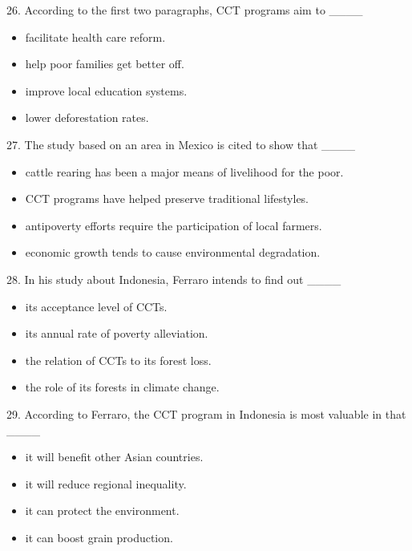 \documentclass[UTF8,11pt]{ctexart}
\begin{document}
26. According to the first two paragraphs, CCT programs aim to \_\_\_\_


\begin{itemize}[leftmargin=2em,itemsep=.2em,topsep=.4em]\item[A.] facilitate health care reform.
\item[B.] help poor families get better off.
\item[C.] improve local education systems.
\item[D.] lower deforestation rates.
\end{itemize}

27. The study based on an area in Mexico is cited to show that \_\_\_\_


\begin{itemize}[leftmargin=2em,itemsep=.2em,topsep=.4em]\item[A.] cattle rearing has been a major means of livelihood for the poor.
\item[B.] CCT programs have helped preserve traditional lifestyles.
\item[C.] antipoverty efforts require the participation of local farmers.
\item[D.] economic growth tends to cause environmental degradation.
\end{itemize}

28. In his study about Indonesia, Ferraro intends to find out \_\_\_\_


\begin{itemize}[leftmargin=2em,itemsep=.2em,topsep=.4em]\item[A.] its acceptance level of CCTs.
\item[B.] its annual rate of poverty alleviation.
\item[C.] the relation of CCTs to its forest loss.
\item[D.] the role of its forests in climate change.
\end{itemize}

29. According to Ferraro, the CCT program in Indonesia is most valuable in that \_\_\_\_


\begin{itemize}[leftmargin=2em,itemsep=.2em,topsep=.4em]\item[A.] it will benefit other Asian countries.
\item[B.] it will reduce regional inequality.
\item[C.] it can protect the environment.
\item[D.] it can boost grain production.
\end{itemize}
\end{document}
